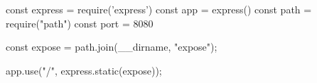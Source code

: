 const express = require('express')
const app = express()
const path = require("path")
const port = 8080

const expose = path.join(__dirname, "expose");

app.use("/", express.static(expose));




